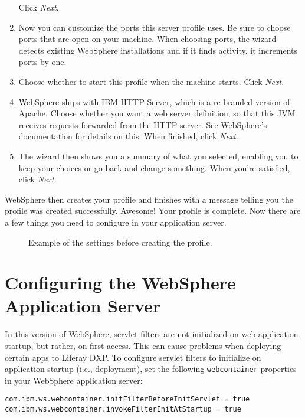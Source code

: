 \begin{enumerate}
  Click \emph{Next}.
\item
  Now you can customize the ports this server profile uses. Be sure to
  choose ports that are open on your machine. When choosing ports, the
  wizard detects existing WebSphere installations and if it finds
  activity, it increments ports by one.
\item
  Choose whether to start this profile when the machine starts. Click
  \emph{Next}.
\item
  WebSphere ships with IBM HTTP Server, which is a re-branded version of
  Apache. Choose whether you want a web server definition, so that this
  JVM receives requests forwarded from the HTTP server. See WebSphere's
  documentation for details on this. When finished, click \emph{Next}.
\item
  The wizard then shows you a summary of what you selected, enabling you
  to keep your choices or go back and change something. When you're
  satisfied, click \emph{Next}.
\end{enumerate}

WebSphere then creates your profile and finishes with a message telling
you the profile was created successfully. Awesome! Your profile is
complete. Now there are a few things you need to configure in your
application server.

\begin{figure}
\centering
{}
\caption{Example of the settings before creating the profile.}
\end{figure}

\section{Configuring the WebSphere Application
Server}\label{configuring-the-websphere-application-server}

In this version of WebSphere, servlet filters are not initialized on web
application startup, but rather, on first access. This can cause
problems when deploying certain apps to Liferay DXP. To configure
servlet filters to initialize on application startup (i.e., deployment),
set the following \texttt{webcontainer} properties in your WebSphere
application server:

\begin{verbatim}
com.ibm.ws.webcontainer.initFilterBeforeInitServlet = true
com.ibm.ws.webcontainer.invokeFilterInitAtStartup = true
\end{verbatim}

